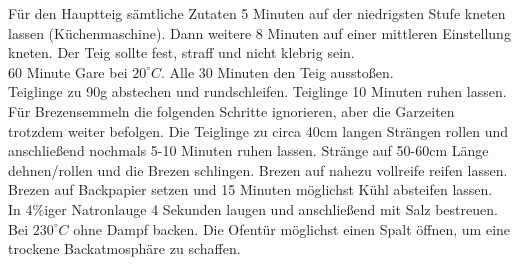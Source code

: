 \begin{tcolorbox}
    Für den Hauptteig sämtliche Zutaten 5 Minuten auf der niedrigsten Stufe kneten lassen (Küchenmaschine).
    Dann weitere 8 Minuten auf einer mittleren Einstellung kneten.
    Der Teig sollte fest, straff und nicht klebrig sein.\\
    60 Minute Gare bei $20^\circ C$.
    Alle 30 Minuten den Teig ausstoßen.\\
    Teiglinge zu 90g abstechen und rundschleifen.
    Teiglinge 10 Minuten ruhen lassen.
    Für Brezensemmeln die folgenden Schritte ignorieren, aber die Garzeiten trotzdem weiter befolgen.
    Die Teiglinge zu circa 40cm langen Strängen rollen und anschließend nochmals 5-10 Minuten ruhen lassen.
    Stränge auf 50-60cm Länge dehnen/rollen und die Brezen schlingen.
    Brezen auf nahezu vollreife reifen lassen.
    Brezen auf Backpapier setzen und 15 Minuten möglichst Kühl absteifen lassen.\\
    In 4\%iger Natronlauge 4 Sekunden laugen und anschließend mit Salz bestreuen.\\
    Bei $230^\circ C$ ohne Dampf backen.
    Die Ofentür möglichst einen Spalt öffnen, um eine trockene Backatmosphäre zu schaffen.
\end{tcolorbox}
\newpage

